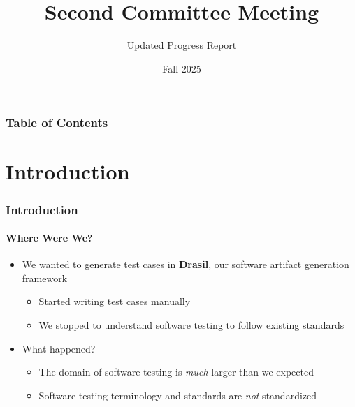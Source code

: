 \documentclass{beamer}
\title[Committee Meeting 2]{Second Committee Meeting}
\subtitle{Updated Progress Report}
\author{\thesisAuthorName{}}
\institute{McMaster University}
\date{Fall 2025}
\begin{document}

\frame{\titlepage}


\begin{frame}
    \frametitle{Table of Contents}
    \tableofcontents
\end{frame}

\section{Introduction}

\begin{frame}
    \frametitle{Introduction}
    \framesubtitle{Where Were We?}
    \begin{itemize}
        \item We wanted to generate test cases in \textbf{Drasil}, our software
              artifact generation framework
              \begin{itemize}
                  \item Started writing test cases manually
                  \item\pause We stopped to understand software testing to follow existing standards
              \end{itemize}

        \item What happened?
              \begin{itemize}
                  \item The domain of software testing is \emph{much} larger than we expected
                  \item Software testing terminology and standards are \emph{not} standardized
              \end{itemize}
    \end{itemize}
\end{frame}
\end{document}
